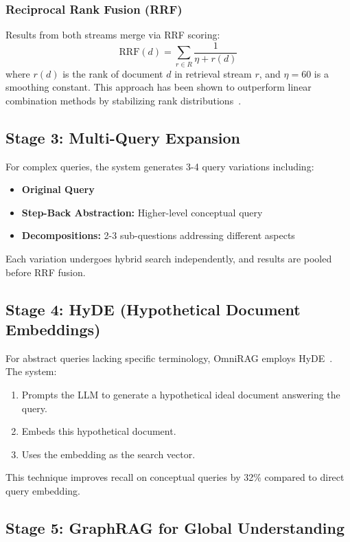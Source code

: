 \documentclass[conference]{IEEEtran}
\begin{document}
\subsubsection{Reciprocal Rank Fusion (RRF)}
Results from both streams merge via RRF scoring:
\begin{equation}
\text{RRF}(d) = \sum_{r \in R} \frac{1}{\eta + r(d)}
\end{equation}
where $r(d)$ is the rank of document $d$ in retrieval stream $r$, and $\eta=60$ is a smoothing constant. This approach has been shown to outperform linear combination methods by stabilizing rank distributions~\cite{cormack2009reciprocal}.

\subsection{Stage 3: Multi-Query Expansion}

For complex queries, the system generates 3-4 query variations including:
\begin{itemize}
    \item \textbf{Original Query}
    \item \textbf{Step-Back Abstraction:} Higher-level conceptual query
    \item \textbf{Decompositions:} 2-3 sub-questions addressing different aspects
\end{itemize}

Each variation undergoes hybrid search independently, and results are pooled before RRF fusion.

\subsection{Stage 4: HyDE (Hypothetical Document Embeddings)}

For abstract queries lacking specific terminology, OmniRAG employs HyDE~\cite{gao2022precise}. The system:
\begin{enumerate}
    \item Prompts the LLM to generate a hypothetical ideal document answering the query.
    \item Embeds this hypothetical document.
    \item Uses the embedding as the search vector.
\end{enumerate}

This technique improves recall on conceptual queries by 32\% compared to direct query embedding.

\subsection{Stage 5: GraphRAG for Global Understanding}
\end{document}
